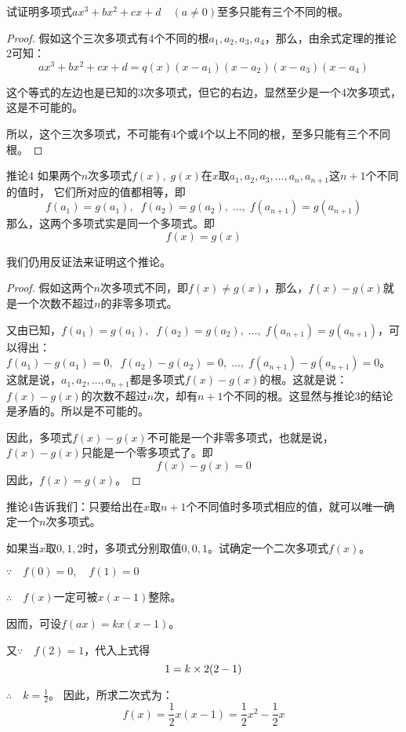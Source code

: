 \begin{example}
    试证明多项式$ax^3+bx^2+cx+d\quad (a\ne 0)$至多只能有三个不同的根。
\end{example}


\begin{proof}
    假如这个三次多项式有4个不同的根$a_1,a_2,a_3,a_4$，那么，由余式定理的推论2可知：
\[ax^3+bx^2+cx+d=q (x) (x-a_1) (x-a_2) (x-a_3) (x-a_4)\]

这个等式的左边也是已知的3次多项式，但它的右边，显然至少是一个4次多项式，这是不可能的。

所以，这个三次多项式，不可能有4个或4个以上不同的根，至多只能有三个不同根。
\end{proof}


\begin{blk}{推论4}
    如果两个$n$次多项式$f(x),\; g(x)$在$x$取$a_1,a_2,a_3,\ldots,a_n,a_{n+1}$这$n+1$个不同的值时，
    它们所对应的值都相等，即
\[f (a_1) =g (a_1) ,\; \; f (a_2) =g (a_2) ,\;  \ldots,\;  f (a_{n+1}) =g (a_{n+1}) \]
那么，这两个多项式实是同一个多项式。即
\[f (x) =g (x) \]
\end{blk}

我们仍用反证法来证明这个推论。

\begin{proof}
假如这两个$n$次多项式不同，即$f(x)\ne g(x)$，那么，$f(x)-g(x)$就是一个次数不超过$n$的非零多项式。

又由已知，$f (a_1) =g (a_1) ,\; \; f (a_2) =g (a_2) ,\;  \ldots,\;  f (a_{n+1}) =g (a_{n+1})$，可以得出：$f (a_1) -g (a_1)=0 ,\; \; f (a_2) -g (a_2)=0 ,\;  \ldots,\;  f (a_{n+1}) -g (a_{n+1})=0$。这就是说，$a_1,a_2,\ldots,a_{n+1}$都是多项式$f(x)-g(x)$的根。这就是说：$f(x)-g(x)$的次数不超过$n$次，却有$n+1$个不同的根。这显然与推论3的结论是矛盾的。所以是不可能的。

因此，多项式$f(x)-g(x)$不可能是一个非零多项式，也就是说，$f(x)-g(x)$只能是一个零多项式了。即
\[f (x) -g (x) =0\]
因此，$f(x)=g(x)$。

\end{proof}

推论4告诉我们：只要给出在$x$取$n+1$个不同值时多项式相应的值，就可以唯一确定一个$n$次多项式。

\begin{example}
如果当$x$取$0, 1, 2$时，多项式分别取值$0,0,1$。试确定一个二次多项式$f(x)$。
\end{example}


\begin{solution}
$\because\quad f(0)=0,\quad f(1)=0$

$\therefore\quad f(x)$一定可被$x(x-1)$整除。

因而，可设$f(ax)=kx(x-1)$。

又$\because\quad f(2)=1$，代入上式得
\[1=k\times2 (2-1) \]

$\therefore\quad k=\frac{1}{2}$。
因此，所求二次式为：
\[f(x)=\frac{1}{2}x(x-1)=\frac{1}{2}x^2-\frac{1}{2}x\]
\end{solution}

